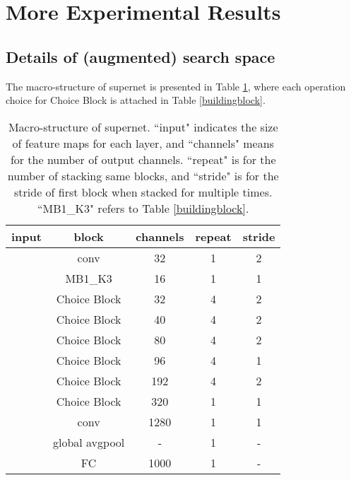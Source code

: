 \documentclass[10pt,twocolumn,letterpaper]{article}
\begin{document}
\section{More Experimental Results}

\subsection{Details of (augmented) search space}
The macro-structure of supernet is presented in Table \ref{supernet}, where each operation choice for Choice Block is attached in Table \ref{buildingblock}. 

\begin{table}[h]
	\centering
	\small
	\caption{Macro-structure of supernet. ``input" indicates the size of feature maps for each layer, and ``channels" means for the number of output channels. ``repeat" is for the number of stacking same blocks, and ``stride" is for the stride of first block when stacked for multiple times. ``MB1\_K3" refers to Table \ref{buildingblock}.}
	\label{supernet}
	\begin{tabular}{c|c|c|c|c} \hline
		{input} &{block} & {channels} & {repeat} & {stride} \\ \hline
		 &  conv & 32 & 1 & 2 \\
		 & MB1\_K3 & 16 & 1 & 1 \\
		 & Choice Block & 32 & 4 & 2 \\
		 & Choice Block & 40 & 4 & 2 \\
		 & Choice Block & 80 & 4 & 2 \\
		 & Choice Block & 96 & 4 & 1 \\
		 & Choice Block & 192 & 4 & 2 \\
		 & Choice Block & 320 & 1 & 1 \\
		 &  conv & 1280 & 1 & 1 \\ 
		 & global avgpool & - & 1 & -\\ 
		 & FC & 1000 & 1& -\\ \hline
	\end{tabular}
\end{table}
\end{document}

